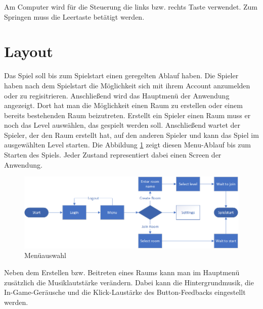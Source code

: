 Am Computer wird für die Steuerung die links bzw. rechts Taste verwendet. Zum Springen muss die Leertaste betätigt werden.


\section{Layout}
\label{sec:konzeption:layout}
Das Spiel soll bis zum Spielstart einen geregelten Ablauf haben. Die Spieler haben nach dem Spielstart die Möglichkeit sich mit ihrem Account anzumelden oder zu regisitrieren. Anschließend wird das Hauptmenü der Anwendung angezeigt. Dort hat man die Möglichkeit einen Raum zu erstellen oder einem bereits bestehenden Raum beizutreten. Erstellt ein Spieler einen Raum muss er noch das Level auswählen, das gespielt werden soll. Anschließend wartet der Spieler, der den Raum erstellt hat, auf den anderen Spieler und kann das Spiel im ausgewählten Level starten. Die Abbildung \ref{fig:konzeption:layout:menu} zeigt diesen Menu-Ablauf bis zum Starten des Spiels. Jeder Zustand representiert dabei einen Screen der Anwendung. 

\begin{figure}[H]
    \begin{center}
      \includegraphics[width=\linewidth]{img/konzeption/Spielablauf}
      \caption{Menüauswahl}
      \label{fig:konzeption:layout:menu}
    \end{center}
\end{figure}

Neben dem Erstellen bzw. Beitreten eines Raums kann man im Hauptmenü zusätzlich die Musiklautstärke verändern. Dabei kann die Hintergrundmusik, die In-Game-Geräusche und die Klick-Laustärke des Button-Feedbacks eingestellt werden.